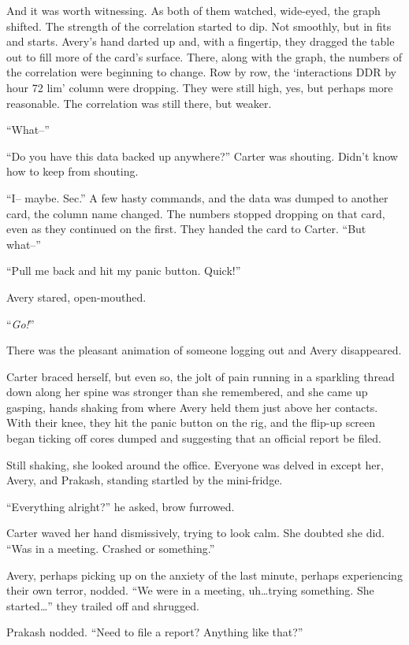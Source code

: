 And it was worth witnessing. As both of them watched, wide-eyed, the graph shifted. The strength of the correlation started to dip. Not smoothly, but in fits and starts. Avery's hand darted up and, with a fingertip, they dragged the table out to fill more of the card's surface. There, along with the graph, the numbers of the correlation were beginning to change. Row by row, the `interactions DDR by hour 72 lim' column were dropping. They were still high, yes, but perhaps more reasonable. The correlation was still there, but weaker.

``What--''

``Do you have this data backed up anywhere?'' Carter was shouting. Didn't know how to keep from shouting.

``I-- maybe. Sec.'' A few hasty commands, and the data was dumped to another card, the column name changed. The numbers stopped dropping on that card, even as they continued on the first. They handed the card to Carter. ``But what--''

``Pull me back and hit my panic button. Quick!''

Avery stared, open-mouthed.

``\emph{Go!}''

There was the pleasant animation of someone logging out and Avery disappeared.

Carter braced herself, but even so, the jolt of pain running in a sparkling thread down along her spine was stronger than she remembered, and she came up gasping, hands shaking from where Avery held them just above her contacts. With their knee, they hit the panic button on the rig, and the flip-up screen began ticking off cores dumped and suggesting that an official report be filed.

Still shaking, she looked around the office. Everyone was delved in except her, Avery, and Prakash, standing startled by the mini-fridge.

``Everything alright?'' he asked, brow furrowed.

Carter waved her hand dismissively, trying to look calm. She doubted she did. ``Was in a meeting. Crashed or something.''

Avery, perhaps picking up on the anxiety of the last minute, perhaps experiencing their own terror, nodded. ``We were in a meeting, uh\ldots{}trying something. She started\ldots{}'' they trailed off and shrugged.

Prakash nodded. ``Need to file a report? Anything like that?''

